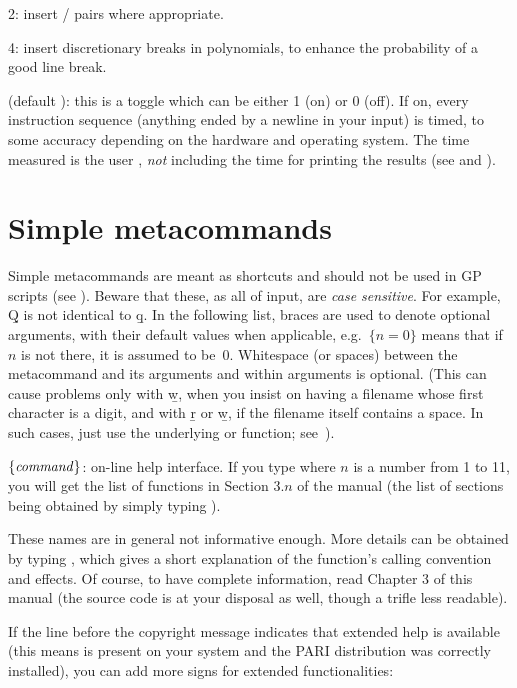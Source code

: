 2: insert  /  pairs where appropriate.

4: insert discretionary breaks in polynomials, to enhance the probability of
a good line break.

 (default ): this is a toggle which can be either 1
(on) or 0 (off). If on, every instruction sequence (anything ended by a
newline in your input) is timed, to some accuracy depending on the hardware
and operating system. The time measured is the user ,
\emph{not} including the time for printing the results (see \kbd{\#} and
\kbd{\#\#}).

\section{Simple metacommands}\label{se:meta}

\noindent
Simple metacommands are meant as shortcuts and should not be used in GP
scripts (see ). Beware that these, as all of  input,
are \emph{case sensitive}. For example, \b{Q} is not identical to \b{q}. In
the following list, braces are used to denote optional arguments, with their
default values when applicable, e.g.~$\{n=0\}$ means that if $n$ is not
there, it is assumed to be~$0$. Whitespace (or spaces) between the
metacommand and its arguments and within arguments is optional. (This can
cause problems only with \b{w}, when you insist on having a filename whose
first character is a digit, and with \b{r} or \b{w}, if the filename itself
contains a space. In such cases, just use the underlying  or
 function; see~).

 $\{\hbox{\it command\/}\}$:  on-line help interface.
If you type  where $n$ is a number from 1 to 11, you will get the
list of functions in Section $3.n$ of the manual (the list of sections being
obtained by simply typing ). \label{se:exthelp}

These names are in general not informative enough. More details can be
obtained by typing , which gives a short explanation of
the function's calling convention and effects. Of course, to have complete
information, read Chapter 3 of this manual (the source code is at your
disposal as well, though a trifle less readable).

If the line before the copyright message indicates that extended help is
available (this means  is present on your system and the PARI
distribution was correctly installed), you can add more  signs for
extended functionalities:

